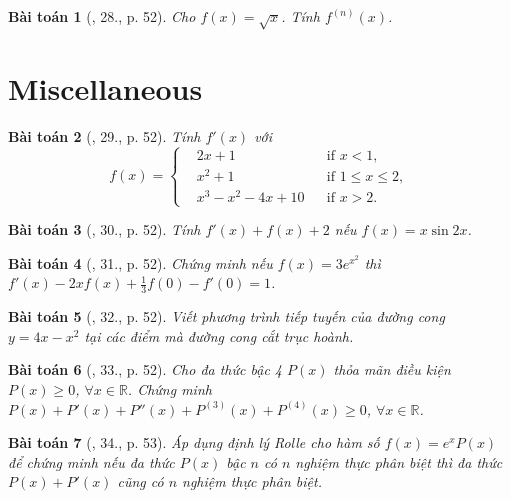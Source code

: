 \documentclass{article}
\newtheorem{baitoan}{Bài toán}
\begin{document}
\begin{baitoan}[\cite{TLCT_BT_dai_so_giai_tich_11}, 28., p. 52]
	Cho $f(x) = \sqrt{x}$. Tính $f^{(n)}(x)$.
\end{baitoan}


\section{Miscellaneous}

\begin{baitoan}[\cite{TLCT_BT_dai_so_giai_tich_11}, 29., p. 52]
	Tính $f'(x)$ với
	\begin{equation}
		f(x) = \left\{\begin{split}
			&2x + 1&&\mbox{if } x < 1,\\
			&x^2 + 1&&\mbox{if } 1\le x\le2,\\
			&x^3 - x^2 - 4x + 10&&\mbox{if } x > 2.
		\end{split}\right.
	\end{equation}
\end{baitoan}

\begin{baitoan}[\cite{TLCT_BT_dai_so_giai_tich_11}, 30., p. 52]
	Tính $f'(x) + f(x) + 2$ nếu $f(x) = x\sin2x$.
\end{baitoan}

\begin{baitoan}[\cite{TLCT_BT_dai_so_giai_tich_11}, 31., p. 52]
	Chứng minh nếu $f(x) = 3e^{x^2}$ thì $f'(x) - 2xf(x) + \frac{1}{3}f(0) - f'(0) = 1$.
\end{baitoan}

\begin{baitoan}[\cite{TLCT_BT_dai_so_giai_tich_11}, 32., p. 52]
	Viết phương trình tiếp tuyến của đường cong $y = 4x - x^2$ tại các điểm mà đường cong cắt trục hoành.
\end{baitoan}

\begin{baitoan}[\cite{TLCT_BT_dai_so_giai_tich_11}, 33., p. 52]
	Cho đa thức bậc 4 $P(x)$ thỏa mãn điều kiện $P(x)\ge0$, $\forall x\in\mathbb{R}$. Chứng minh $P(x) + P'(x) + P''(x) + P^{(3)}(x) + P^{(4)}(x)\ge0$, $\forall x\in\mathbb{R}$.
\end{baitoan}

\begin{baitoan}[\cite{TLCT_BT_dai_so_giai_tich_11}, 34., p. 53]
	Áp dụng định lý Rolle cho hàm số $f(x) = e^xP(x)$ để chứng minh nếu đa thức $P(x)$ bậc $n$ có $n$ nghiệm thực phân biệt thì đa thức $P(x) + P'(x)$ cũng có $n$ nghiệm thực phân biệt.
\end{baitoan}
\end{document}
